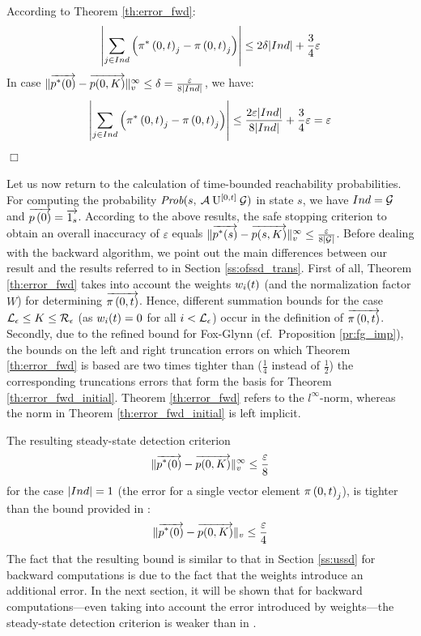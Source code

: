 \documentclass[a4paper,11pt]{article}
\newenvironment{proof}{\trivlist \item[\hskip \labelsep{\bf Proof}]}{\hfill\hbox{$\Box$}\endtrivlist}
\begin{document}
		\begin{proof}
			According to Theorem \ref{th:error_fwd}:
			\begin{equation}
				\left| \sum_{j \in Ind} \left( \pi^{*} \left(0, t \right )_{j} - \pi \left(0, t \right )_{j} \right) \right| \leq 2 \delta |Ind| + \frac{3}{4} \varepsilon \nonumber
			\end{equation}
			In case $\lVert  \overrightarrow{p^{*}(0)} - \overrightarrow{p(0,K)}  \rVert_{v}^{\infty} \leq \delta = \frac{\varepsilon}{8 |Ind|}$, we have:
			\begin{equation}
				\left| \sum_{j \in Ind} \left( \pi^{*} \left(0, t \right )_{j} - \pi \left(0, t \right )_{j} \right) \right| \leq \frac{2 \varepsilon |Ind|}{8 |Ind|}  + \frac{3}{4} \varepsilon = \varepsilon \nonumber
			\end{equation}
		\end{proof}
		
		Let us now return to the calculation of time-bounded reachability probabilities. For computing the probability $\mbox{\it Prob}(s, \: \mathcal{A} \: \mathrm{U}^{[0,t]} \: \mathcal{G} )$ in state $s$, we have $Ind = \mathcal{G}$ and $\overrightarrow{p \left( 0 \right)} = \overrightarrow{1_{s} }$.  According to the above results, the safe stopping criterion to obtain an overall inaccuracy of $\varepsilon$ equals  $\lVert  \overrightarrow{p^{*}(s)} - \overrightarrow{p(s,K)}  \rVert_{v}^{\infty} \leq \frac{\varepsilon}{8 | \mathcal{G} |}$.  Before dealing with the backward algorithm, we point out the main differences between our result and the results referred to in Section \ref{ss:ofssd_trans}.
		First of all, Theorem \ref{th:error_fwd} takes into account the weights $w_{i}(t)$ (and the normalization factor $W$) for determining $\overrightarrow{\pi \left(0, t \right )}$.  Hence, different summation bounds for the case $\mathcal{L}_{\epsilon} \leq K \leq \mathcal{R}_{\epsilon}$ (as $w_{i}(t) = 0$ for all $i < \mathcal{L}_{\epsilon}$) occur in the definition of $\overrightarrow{\pi \left(0, t \right )}$.  Secondly, due to the refined bound for Fox-Glynn (cf.\ Proposition \ref{pr:fg_imp}), the bounds on the left and right truncation errors on which Theorem \ref{th:error_fwd} is based are two times tighter than ($\frac{1}{4}$ instead of $\frac{1}{2}$) the corresponding truncations errors that form the basis for Theorem \ref{th:error_fwd_initial}.  Theorem \ref{th:error_fwd} refers to the $l^{\infty}$-norm, whereas the norm in Theorem \ref{th:error_fwd_initial} is left implicit.

		The resulting steady-state detection criterion
			\[\lVert  \overrightarrow{p^{*}(0)} - \overrightarrow{p(0,K)}  \rVert_{v}^{\infty} \leq \frac{\varepsilon}{8}\]
		for the case $|Ind| = 1$ (the error for a single vector element $\pi \left(0, t \right )_{j}$), is tighter than the bound provided in \cite{MalhotraMT_MR94}:
			\[\lVert \overrightarrow{p^{*}(0)} - \overrightarrow{p(0,K)} \rVert_{v} \leq \frac{\varepsilon}{4}\]
		The fact that the resulting bound is similar to that in Section \ref{ss:ussd} for backward computations is due to the fact that the weights introduce an additional error. In the next section, it will be shown that for backward computations---even taking into account the error introduced by weights---the steady-state detection criterion is weaker than in \cite{YounesKNP_STTT05} . 
				
\end{document}
